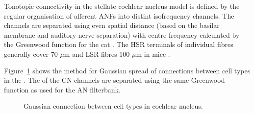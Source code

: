 Tonotopic connectivity in the stellate cochlear nucleus model is defined by the regular organisation of afferent ANFs into distint isofrequency channels.
The channels are separated using even spatial distance (based on the basilar membrane and auditory nerve separation) with centre frequency calculated by the Greenwood function for the cat \citep[see \ref{tab:ModelSummary},]{Greenwood:1990}.
The HSR terminals of individual fibres generally cover 70 $\mu$m and LSR fibres 100 $\mu$m in mice \citep{OertelWuEtAl:1988,OertelWu:1989}.


Figure~\ref{fig:CNconn} shows the method for Gaussian spread of connections between cell types in the \CN.
The \CF of the CN channels are separated using the same Greenwood function as used for the AN filterbank.








\begin{figure}[htb]
  \begin{center}
    \caption{Gaussian connection between cell types in cochlear nucleus.}
    \label{fig:CNconn}
  \end{center}
\end{figure}

